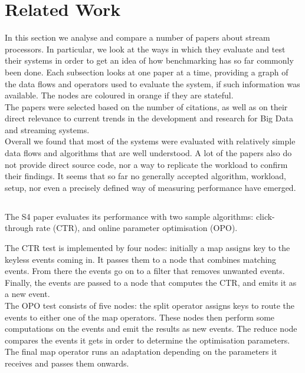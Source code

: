 \section{Related Work}
In this section we analyse and compare a number of papers about stream processors. In particular, we look at the ways in which they evaluate and test their systems in order to get an idea of how benchmarking has so far commonly been done. Each subsection looks at one paper at a time, providing a graph of the data flows and operators used to evaluate the system, if such information was available. The nodes are coloured in orange if they are stateful. \\

The papers were selected based on the number of citations, as well as on their direct relevance to current trends in the development and research for Big Data and streaming systems. \\

Overall we found that most of the systems were evaluated with relatively simple data flows and algorithms that are well understood. A lot of the papers also do not provide direct source code, nor a way to replicate the workload to confirm their findings. It seems that so far no generally accepted algorithm, workload, setup, nor even a precisely defined way of measuring performance have emerged.

\subsection{}
The S4 paper evaluates its performance with two sample algorithms: click-through rate (CTR), and online parameter optimisation (OPO). \\


The CTR test is implemented by four nodes: initially a map assigns key to the keyless events coming in. It passes them to a node that combines matching events. From there the events go on to a filter that removes unwanted events. Finally, the events are passed to a node that computes the CTR, and emits it as a new event. \\

The OPO test consists of five nodes: the split operator assigns keys to route the events to either one of the map operators. These nodes then perform some computations on the events and emit the results as new events. The reduce node compares the events it gets in order to determine the optimisation parameters. The final map operator runs an adaptation depending on the parameters it receives and passes them onwards.

